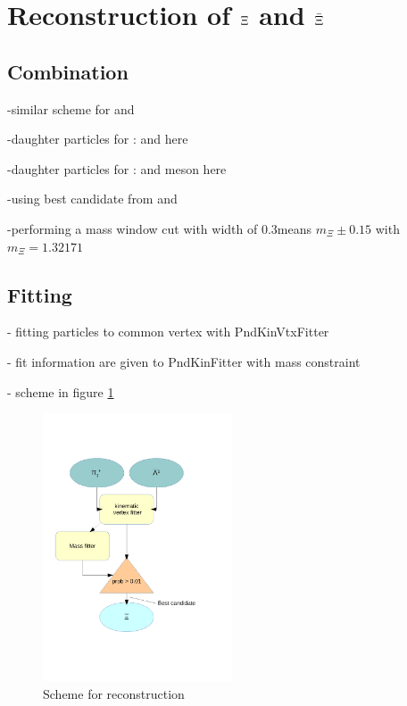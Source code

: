 		
		
		
	
\section{Reconstruction of $\boldmath{\Xi}$ and $\boldmath{\bar{\Xi}}$}
	\subsection*{Combination}
	
		-similar scheme for \lam and \alam
		
		-daughter particles for \anticascade: \alam and \piplus here \piplusone
		
		-daughter particles for \cascade:  \lam and \piminus meson here \piminusone
		
		-using best candidate from \lam and \alam
		
		-performing a mass window cut with width of $0.3$\massunit means $m_{\Xi} \pm 0.15$ \massunit with $m_{\Xi} = 1.32171$ \massunit \cite{PDG}
		 
		
		
	\subsection*{Fitting}
	
		- fitting particles to common vertex with PndKinVtxFitter
		
		- fit information are given to PndKinFitter with mass constraint
		
		- scheme in figure \ref{fig:anticascade_scheme}
		
		\begin{figure}
			\centering
				\includegraphics[width=0.50\textwidth]{./plots/combineAntiCascade.pdf}
			\caption{Scheme for \anticascade reconstruction}
			\label{fig:anticascade_scheme}
		\end{figure}
		
